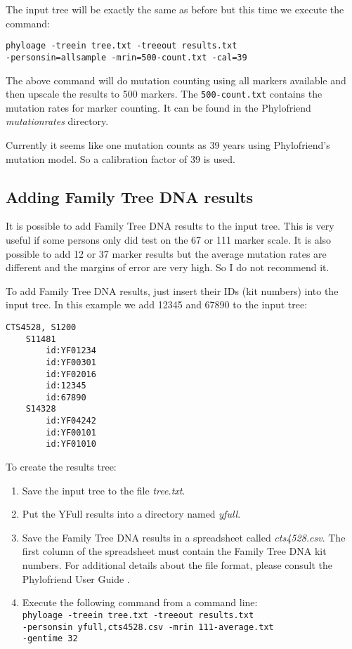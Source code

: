 The input tree will be exactly the same as before but this time
we execute the command:

\vspace{1ex}\noindent
\texttt{phyloage -treein tree.txt -treeout results.txt\\
-personsin=allsample -mrin=500-count.txt -cal=39 }
\vspace{1ex}

\noindent The above command will do mutation counting using
all markers available and then upscale the results to 500
markers. The \texttt{500-count.txt} contains the mutation rates
for marker counting. It can be found in the Phylofriend
\cite{Phylofriend} \emph{mutationrates} directory.

Currently it seems like one mutation counts as 39 years
using Phylofriend's mutation model. So a calibration factor
of 39 is used.


\subsection{Adding Family Tree DNA results}

It is possible to add Family Tree DNA results to the input
tree. This is very useful if some persons only did test on
the 67 or 111 marker scale. It is also possible to add 12 or
37 marker results but the average mutation rates are different
and the margins of error are very high. So I do not recommend
it.

To add Family Tree DNA results, just insert their IDs
(kit numbers) into the input tree. In this example we add
12345 and 67890 to the input tree:

\begin{verbatim}
CTS4528, S1200
    S11481
        id:YF01234
        id:YF00301
        id:YF02016
        id:12345
        id:67890
    S14328
        id:YF04242
        id:YF00101
        id:YF01010
\end{verbatim}

To create the results tree:

\begin{enumerate}
\item Save the input tree to the file \emph{tree.txt}.
\item Put the YFull results into a directory named
	\emph{yfull}.
\item Save the Family Tree DNA results in a spreadsheet
	called \emph{cts4528.csv}. The first column of the 
	spreadsheet must contain the Family Tree DNA kit numbers.
	For additional details about the file format, please
	consult the Phylofriend User Guide \cite{PhylofriendUserGuide}.
\item Execute the following command from a command line:\\
	\texttt{phyloage -treein tree.txt -treeout results.txt\\
	-personsin yfull,cts4528.csv -mrin 111-average.txt\\
	-gentime 32}
\end{enumerate}

